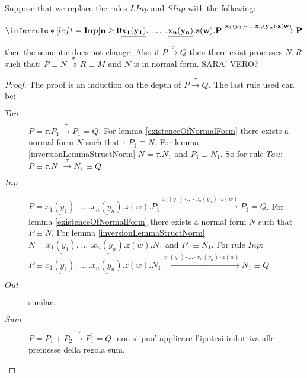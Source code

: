 \begin{proposition}\label{moveCongDownNorm}
  Suppose that we replace the rules $LInp$ and $SInp$ with the following:
  \begin{center}
    $\inferrule* [left=\bf{Inp}]{
      n \geq 0
    }{
      \underline{x_{1}(y_{1})}.\; \ldots\; .\underline{x_{n}(y_{n})}.z(w).P 
	\xrightarrow{x_{1}(y_{1})\cdot \ldots \cdot x_{n}(y_{n})\cdot z(w)} 
	  P
    }$
  \end{center}
  then the semantic does not change. Also if $P\xrightarrow{\sigma} Q$ then there exist processes $N,R$ such that: $P \equiv N\stackrel{\sigma}{\twoheadrightarrow} R \equiv M$ and $N$ is in normal form.
  SARA' VERO?
  \begin{proof}
    The proof is an induction on the depth of $P\xrightarrow{\sigma} Q$. The last rule used can be:
    \begin{description}
      \item[$Tau$] 
	$P=\tau.P_{1} \xrightarrow{\tau} P_{1}=Q$. For lemma \ref{existenceOfNormalForm} there exists a normal form $N$ such that $\tau.P_{1}\equiv N$. For lemma \ref{inversionLemmaStructNorm} $N=\tau.N_{1}$ and $P_{1}\equiv N_{1}$. So for rule $Tau$: $P \equiv \tau.N_{1}\xrightarrow{\tau} N_{1} \equiv Q$ 
      \item[$Inp$]
	$P=\underline{x_{1}(y_{1})}.\; \ldots\; .\underline{x_{n}(y_{n})}.z(w).P_{1}
	  \xrightarrow{x_{1}(y_{1})\cdot \ldots \cdot x_{n}(y_{n})\cdot z(w)} 
	    P_{1}=Q$. For lemma \ref{existenceOfNormalForm} there exists a normal form $N$ such that $P\equiv N$. For lemma \ref{inversionLemmaStructNorm} $N=\underline{x_{1}(y_{1})}.\; \ldots\; .\underline{x_{n}(y_{n})}.z(w).N_{1}$ and $P_{1}\equiv N_{1}$. For rule $Inp$: 
	    $P\equiv \underline{x_{1}(y_{1})}.\; \ldots\; .\underline{x_{n}(y_{n})}.z(w).N_{1}
	      \xrightarrow{x_{1}(y_{1})\cdot \ldots \cdot x_{n}(y_{n})\cdot z(w)} 
		N_{1}\equiv Q$
      \item[$Out$] 
	similar.
      \item[$Sum$]
	$P=P_{1}+P_{2} \xrightarrow{\gamma} P_{1}^{'}=Q$. non si puo' applicare l'ipotesi induttiva alle premesse della regola sum.
    \end{description}
  \end{proof}
\end{proposition}

